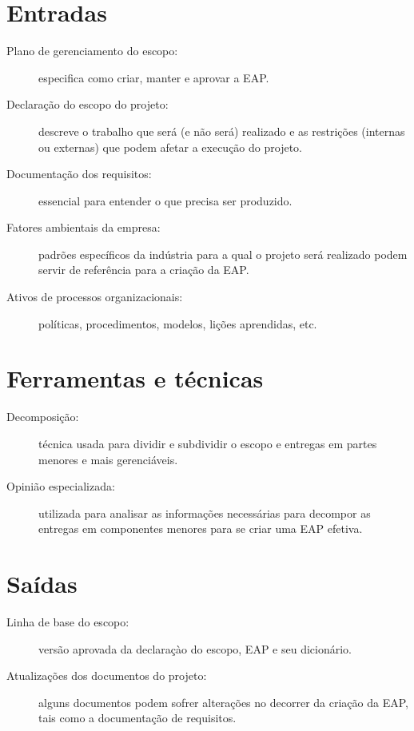 \section{Entradas}

\begin{description}
	
	\item[Plano de gerenciamento do escopo:] especifica como criar, manter e aprovar a EAP.
	
	\item[Declaração do escopo do projeto:] descreve o trabalho que será (e não será) realizado e as restrições (internas ou externas) que podem afetar a execução do projeto.
	
	\item[Documentação dos requisitos:] essencial para entender o que precisa ser produzido.
	
	\item[Fatores ambientais da empresa:] padrões específicos da indústria para a qual o projeto será realizado podem servir de referência para a criação da EAP. 
	
	\item[Ativos de processos organizacionais:] políticas, procedimentos, modelos, lições aprendidas, etc.
	
\end{description}

\section{Ferramentas e técnicas}

\begin{description}
	
	\item[Decomposição:] técnica usada para dividir e subdividir o escopo e entregas em partes menores e mais gerenciáveis.
	
	\item[Opinião especializada:] utilizada para analisar as informações necessárias para decompor as entregas em componentes menores para se criar uma EAP efetiva.
	
\end{description}

\section{Saídas}

\begin{description}
	
	\item[Linha de base do escopo:] versão aprovada da declaraçào do escopo, EAP e seu dicionário.
	
	\item[Atualizações dos documentos do projeto:] alguns documentos podem sofrer alterações no decorrer da criação da EAP, tais como a documentação de requisitos.
	
\end{description}

